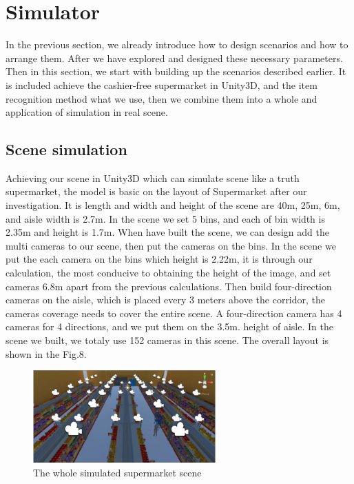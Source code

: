 \section{Simulator}

In the previous section, we already introduce how to design scenarios and how to arrange them.
After we have explored and designed these necessary parameters.
Then in this section, we start with building up the scenarios described earlier.
It is included achieve the cashier-free supermarket in Unity3D, and the item recognition method what we use, then we combine them into a whole and application of simulation in real scene.

\subsection{Scene simulation}

Achieving our scene in Unity3D  which can simulate scene like a truth supermarket, the model is basic on the layout of Supermarket after our investigation.
It is length and width and height of the scene are 40m, 25m, 6m, and aisle width is 2.7m.
In the scene we set 5 bins, and each of bin width is 2.35m and height is 1.7m.
When have built the scene, we can design add the multi cameras to our scene, then put the cameras on the bins.
In the scene we put the each camera on the bins which height is 2.22m, it is through our calculation, the most conducive to obtaining the height of the image, and set cameras 6.8m apart from the previous calculations.
Then build four-direction cameras on the aisle, which is placed every 3 meters above the corridor, the cameras coverage needs to cover the entire scene.
A four-direction camera has 4 cameras for 4 directions, and we put them on the 3.5m. height of aisle.
In the scene we built, we totaly use 152 cameras in this scene.
The overall layout is shown in the Fig.8.

\begin{figure}[htbp]
\centerline{\includegraphics[width=7cm,scale=0.8]{supermarket.jpg}}
\caption{The whole simulated supermarket scene}
\label{fig}
\end{figure}

